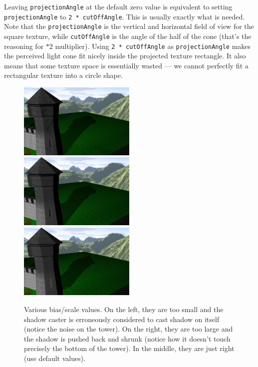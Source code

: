 \documentclass{acmsiggraph}                     %
\begin{document}
Leaving \texttt{projectionAngle} at the default zero value is equivalent
to setting \texttt{projectionAngle} to \texttt{2 * cutOffAngle}.
This is usually exactly what is needed.
Note that the \texttt{projectionAngle} is
the vertical and horizontal field of view for the square texture,
while \texttt{cutOffAngle} is the angle of the half of the cone
(that's the reasoning for $*2$ multiplier).
Using \texttt{2 * cutOffAngle} as \texttt{projectionAngle}
makes the perceived light cone fit nicely inside the projected
texture rectangle. It also means that some texture space is essentially
wasted --- we cannot perfectly fit a rectangular texture into a circle shape.

\begin{figure}[t]
  \centering
  \includegraphics[width=2.2in]{scale_bias_too_small}
  \includegraphics[width=2.2in]{scale_bias_right}
  \includegraphics[width=2.2in]{scale_bias_too_large}
  \caption{Various bias/scale values.
On the left, they are too small and the shadow caster is erroneously considered to cast shadow on itself (notice the noise on the tower).
On the right, they are too large and the shadow is pushed back and shrunk (notice how it doesn't touch precisely the bottom of the tower).
In the middle, they are just right (use default values).}
  \label{fig_scale_bias}
\end{figure}
\end{document}
